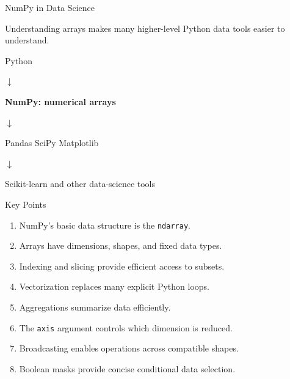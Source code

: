 \documentclass[11pt,aspectratio=43]{beamer}
\begin{document}
\begin{frame}{NumPy in Data Science}

\begin{block}{}
Understanding arrays makes many higher-level Python data tools easier to understand.
\end{block}

\begin{center}

Python

\vspace{0.3cm}

$\downarrow$

\vspace{0.3cm}

\textbf{NumPy: numerical arrays}

\vspace{0.3cm}

$\downarrow$

\vspace{0.3cm}

Pandas \qquad SciPy \qquad Matplotlib

\vspace{0.3cm}

$\downarrow$

\vspace{0.3cm}

Scikit-learn and other data-science tools

\end{center}

\end{frame}

\begin{frame}{Key Points}

\begin{enumerate}
\item NumPy's basic data structure is the \texttt{ndarray}.
\item Arrays have dimensions, shapes, and fixed data types.
\item Indexing and slicing provide efficient access to subsets.
\item Vectorization replaces many explicit Python loops.
\item Aggregations summarize data efficiently.
\item The \texttt{axis} argument controls which dimension is reduced.
\item Broadcasting enables operations across compatible shapes.
\item Boolean masks provide concise conditional data selection.
\end{enumerate}

\end{frame}
\end{document}
